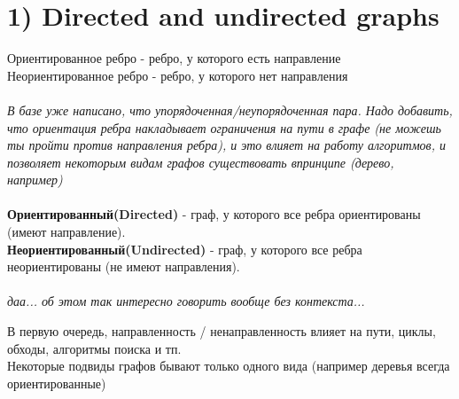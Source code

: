 \documentclass[../TM3-UltraDoc.tex]{subfiles}
\begin{document}
	\section*{1) Directed and undirected graphs}
	Ориентированное ребро - ребро, у которого есть направление\\
	Неориентированное ребро - ребро, у которого нет направления\\
	\\
	\noindent
	\textit{В базе уже написано, что упорядоченная/неупорядоченная пара. Надо добавить, что ориентация ребра накладывает ограничения на пути в графе (не можешь ты пройти против направления ребра), и это влияет на работу алгоритмов, и позволяет некоторым видам графов существовать впринципе (дерево, например)}\\
	\\
	\noindent
	\textbf{Ориентированный(Directed)} - граф, у которого все ребра ориентированы (имеют направление).\\
	\textbf{Неориентированный(Undirected)} - граф, у которого все ребра неориентированы (не имеют направления).\\
	\\
	\textit{даа... об этом так интересно говорить вообще без контекста...}\\
	\small
	\begin{tcolorbox}[colframe=gray!50!black, left=5pt, right=5pt, top=5pt, bottom=5pt, boxrule=1pt, title=\textbf{Так что контекста навалю я}, colback=gray!10!white]
		В первую очередь, направленность / ненаправленность влияет на пути, циклы, обходы, алгоритмы поиска и тп.\\
		Некоторые подвиды графов бывают только одного вида (например деревья всегда ориентированные)
	\end{tcolorbox}
	\normalsize
		
\end{document}
